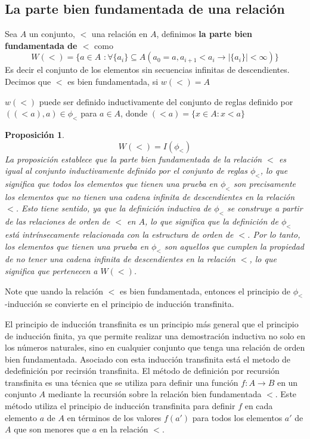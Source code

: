 \documentclass[executivepaper]{article}
\newtheorem{propo}{Proposición}[section]
\begin{document}
\subsection{La parte bien fundamentada de una relación}
Sea $A$ un conjunto, $<$ una relación en $A$, definimos \textbf{la parte bien fundamentada de $<$} como 
$$W(<) = \{a\in A\,\, : \forall \{a_i\}\subseteq A (a_0 = a, a_{i+1}<a_i\rightarrow |\{a_i\}|<\infty)\}$$
Es decir el conjunto de los elementos sin secuencias infinitas de descendientes. Decimos que $<$ es bien fundamentada, si $w(<) = A$

$w(<)$ puede ser definido inductivamente del conjunto de reglas definido por $((<a),a) \in\phi_<$ para $a\in A$, donde $(<a) = \{x\in A: x<a\}$

\begin{propo}
    $$W(<) = I(\phi_<)$$
    La proposición establece que la parte bien fundamentada de la relación $<$ es igual al conjunto inductivamente definido por el conjunto de reglas $\phi_<$, lo que significa que todos los elementos que tienen una prueba en $\phi_<$ son precisamente los elementos que no tienen una cadena infinita de descendientes en la relación $<$. Esto tiene sentido, ya que la definición inductiva de $\phi_<$ se construye a partir de las relaciones de orden de $<$ en $A$, lo que significa que la definición de $\phi_<$ está intrínsecamente relacionada con la estructura de orden de $<$. Por lo tanto, los elementos que tienen una prueba en $\phi_<$ son aquellos que cumplen la propiedad de no tener una cadena infinita de descendientes en la relación $<$, lo que significa que pertenecen a $W(<)$.
\end{propo}
Note que uando la relación $<$ es bien fundamentada, entonces el principio de $\phi_<$-inducción se convierte en el principio de inducción transfinita.

El principio de inducción transfinita es un principio más general que el principio de inducción finita, ya que permite realizar una demostración inductiva no solo en los números naturales, sino en cualquier conjunto que tenga una relación de orden bien fundamentada.
Asociado con esta inducción transfinita está el metodo de dedefinición por recirsión transfinita. El método de definición por recursión transfinita es una técnica que se utiliza para definir una función $f: A \rightarrow B$ en un conjunto $A$ mediante la recursión sobre la relación bien fundamentada $<$. Este método utiliza el principio de inducción transfinita para definir $f$ en cada elemento $a$ de $A$ en términos de los valores $f(a')$ para todos los elementos $a'$ de $A$ que son menores que $a$ en la relación $<$.
\end{document}
